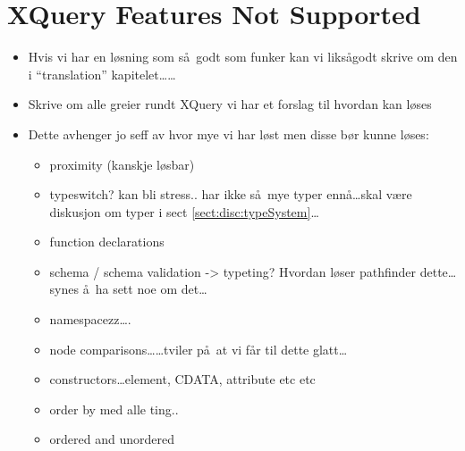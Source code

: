 \section{XQuery Features Not Supported}
\label{sect:discussion:notSupported}
\begin{itemize}
  \item Hvis vi har en l\o sning som s\aa~godt som funker kan vi liks\aa godt skrive om den i ``translation''
  kapitelet\ldots\ldots
  \item Skrive om alle greier rundt XQuery vi har et forslag til hvordan kan
  l\o ses
  \item Dette avhenger jo seff av hvor mye vi har l\o st men disse b\o r kunne
  l\o ses:
  	\begin{itemize}
  		\item proximity (kanskje l\o sbar)
  		\item typeswitch? kan bli stress.. har ikke s\aa~mye typer enn\aa \ldots skal v\ae re diskusjon om typer i
  		sect \ref{sect:disc:typeSystem}\ldots
  		\item function declarations
  		\item schema / schema validation -> typeting? Hvordan l\o ser pathfinder dette\ldots synes \aa~ha sett noe om
  		det\ldots
  		\item namespacezz\ldots.
  		\item node comparisons\ldots\ldots tviler p\aa~at vi f\aa r til dette glatt\ldots
  		\item constructors\ldots element, CDATA, attribute etc etc
  		\item order by med alle ting..
  		\item ordered and unordered
  		\end{itemize}
	\end{itemize}
